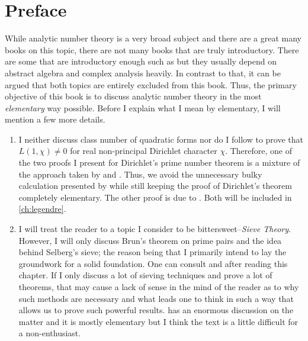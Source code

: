 \documentclass[12pt,leqno,]{book}
\theoremstyle{definition}
\theoremstyle{definition}
\begin{document}
	\section*{Preface}
	While analytic number theory is a very broad subject and there are a great many books on this topic, there are not many books that are truly introductory. There are some that are introductory enough such as \textcite{apostol_1976} but they usually depend on abstract algebra and complex analysis heavily. In contrast to that, it can be argued that both topics are entirely excluded from this book. Thus, the primary objective of this book is to discuss analytic number theory in the most \textit{elementary} way possible. Before I explain what I mean by elementary, I will mention a few more details.
		\begin{enumerate}[(1)]
			\item I neither discuss class number of quadratic forms nor do I follow \textcite[Part Two, Chapter III]{landau_1969} to prove that $L(1,\chi)\neq0$ for real non-principal Dirichlet character $\chi$. Therefore, one of the two proofs I present for Dirichlet's prime number theorem is a mixture of the approach taken by \textcite[Part two, Chapter III, $\S$3]{landau_1969} and \textcite[Chapter VI]{apostol_1976}. Thus, we avoid the unnecessary bulky calculation presented by \textcite[Theorem 152]{landau_1969} while still keeping the proof of Dirichlet's theorem completely elementary. The other proof is due to \textcite{selberg_1949}. Both will be included in \autoref{ch:legendre}.
			\item I will treat the reader to a topic I consider to be bittersweet--\textit{Sieve Theory}. However, I will only discuss Brun's theorem on prime pairs and the idea behind Selberg's sieve; the reason being that I primarily intend to lay the groundwork for a solid foundation. One can consult \textcite{cojocaru_murty_2006} and \textcite{friedlander_iwaniec_2010} after reading this chapter. If I only discuss a lot of sieving techniques and prove a lot of theorems, that may cause a lack of sense in the mind of the reader as to why such methods are necessary and what leads one to think in such a way that allows us to prove such powerful results. \textcite{friedlander_iwaniec_2010} has an enormous discussion on the matter and it is mostly elementary but I think the text is a little difficult for a non-enthusiast.

\end{enumerate}
\end{document}
